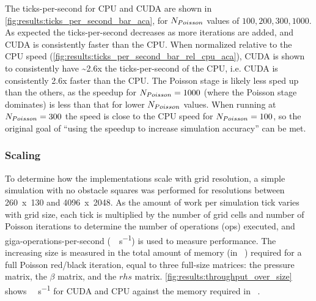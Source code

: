 


The ticks-per-second for CPU and CUDA are shown in \cref{fig:results:ticks_per_second_bar_aca}, for $N_{Poisson}$ values of ${100, 200, 300, 1000}$.
As expected the ticks-per-second decreases as more iterations are added, and CUDA is consistently faster than the CPU.
When normalized relative to the CPU speed (\cref{fig:results:ticks_per_second_bar_rel_cpu_aca}), CUDA is shown to consistently have \textasciitilde{}2.6x the ticks-per-second of the CPU, i.e. CUDA is consistently 2.6x faster than the CPU. 
The Poisson stage is likely less sped up than the others, as the speedup for $N_{Poisson}{} = 1000$ (where the Poisson stage dominates) is less than that for lower $N_{Poisson}{}$ values.
When running at $N_{Poisson}{} = 300$ the speed is close to the CPU speed for $N_{Poisson} = 100$, so the original goal of ``using the speedup to increase simulation accuracy'' can be met.

\subsubsection{Scaling}
To determine how the implementations scale with grid resolution, a simple simulation with no obstacle squares was performed for resolutions between 260~x~130 and 4096~x~2048.
As the amount of work per simulation tick varies with grid size, each tick is multiplied by the number of grid cells and number of Poisson iterations to determine the number of operations (\si{op}s) executed, and giga-operations-per-second (\si{\giga\op\per\second}) is used to measure performance.
The increasing size is measured in the total amount of memory (in \si{\mega\byte}) required for a full Poisson red/black iteration, equal to three full-size matrices: the pressure matrix, the $\beta$ matrix, and the $rhs$ matrix.
\cref{fig:results:throughput_over_size} shows \si{\giga\op\per\second} for CUDA and CPU against the memory required in \si{\mega\byte}.




\pagebreak

